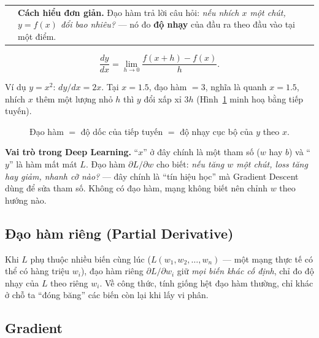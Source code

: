 \documentclass[12pt,a4paper]{article}
\makeatletter
\newenvironment{tructiep}[1][Cách hiểu đơn giản]
  {\par\smallskip\noindent\begin{tabular}{@{}p{0.35em}@{\hspace{6pt}}p{\dimexpr\linewidth-1.9em\relax}@{}}
   \textcolor{boxln}{\rule{2pt}{\baselineskip}} & \textbf{#1.}\enspace\ignorespaces}
  {\end{tabular}\par\smallskip}
\makeatother
\begin{document}
\begin{tructiep}
Đạo hàm trả lời câu hỏi: \emph{nếu nhích $x$ một chút, $y=f(x)$ đổi bao
nhiêu?} --- nó đo \textbf{độ nhạy} của đầu ra theo đầu vào tại một điểm.
\end{tructiep}

$$\frac{dy}{dx} = \lim_{h\to 0}\frac{f(x+h)-f(x)}{h}.$$

Ví dụ $y=x^2$: $dy/dx=2x$. Tại $x=1.5$, đạo hàm $=3$, nghĩa là quanh
$x=1.5$, nhích $x$ thêm một lượng nhỏ $h$ thì $y$ đổi xấp xỉ $3h$ (Hình~\ref{fig:deriv}
minh hoạ bằng tiếp tuyến).

\begin{figure}[H]
\centering
{}
\caption{Đạo hàm $=$ độ dốc của tiếp tuyến $=$ độ nhạy cục bộ của $y$ theo $x$.}
\label{fig:deriv}
\end{figure}

\textbf{Vai trò trong Deep Learning.} ``$x$'' ở đây chính là một tham số
($w$ hay $b$) và ``$y$'' là hàm mất mát $L$. Đạo hàm $\partial L/\partial w$
cho biết: \emph{nếu tăng $w$ một chút, loss tăng hay giảm, nhanh cỡ nào?}
--- đây chính là ``tín hiệu học'' mà Gradient Descent dùng để sửa tham số.
Không có đạo hàm, mạng không biết nên chỉnh $w$ theo hướng nào.

\subsection{Đạo hàm riêng (Partial Derivative)}

Khi $L$ phụ thuộc nhiều biến cùng lúc ($L(w_1,w_2,\ldots,w_n)$ --- một
mạng thực tế có thể có hàng triệu $w_i$), đạo hàm riêng
$\partial L/\partial w_i$ giữ \emph{mọi biến khác cố định}, chỉ đo độ nhạy
của $L$ theo riêng $w_i$. Về công thức, tính giống hệt đạo hàm thường, chỉ
khác ở chỗ ta ``đóng băng'' các biến còn lại khi lấy vi phân.

\subsection{Gradient}
\end{document}
